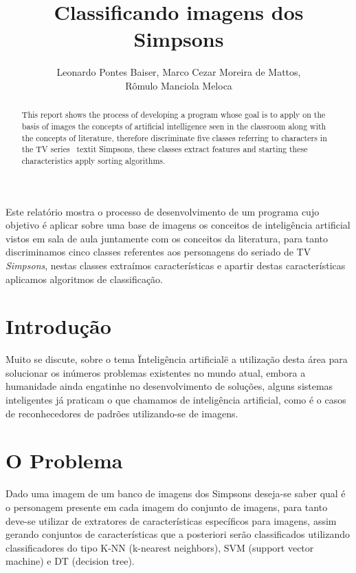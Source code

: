\documentclass[12pt]{article}
\title{Classificando imagens dos Simpsons}
\author{Leonardo Pontes Baiser\inst{1}, Marco Cezar Moreira de Mattos\inst{1},\\
		Rômulo Manciola Meloca\inst{1}}
\begin{document}
	
\maketitle

\begin{abstract}

	This report shows the process of developing a program whose goal is to apply on the basis of images the 	concepts of artificial intelligence seen in the classroom along with the concepts of literature, therefore discriminate five classes referring to characters in the TV series \ textit {Simpsons}, these classes extract features and starting these characteristics apply sorting algorithms.

	\end{abstract}
     
\begin{resumo} 
  Este relatório mostra o processo de desenvolvimento de um programa cujo objetivo é aplicar sobre uma base de imagens os conceitos de inteligência artificial vistos em sala de aula juntamente com os conceitos da literatura, para tanto discriminamos cinco classes referentes aos personagens do seriado de TV \textit{Simpsons}, nestas classes extraímos características e apartir destas características aplicamos algoritmos de classificação.	
\end{resumo}

\section{Introdução}\label{sec:introducao}

	Muito se discute, sobre o tema \"Inteligência artificial\" e a utilização desta área para solucionar os inúmeros problemas existentes no mundo atual, embora a humanidade ainda engatinhe no desenvolvimento de soluções, alguns sistemas inteligentes já praticam o que chamamos de inteligência artificial, como é o casos de reconhecedores de padrões utilizando-se de imagens.

\section{O Problema}\label{sec:problema}

	Dado uma imagem de um banco de imagens dos Simpsons deseja-se saber qual é o personagem presente em cada imagem do conjunto de imagens, para tanto deve-se utilizar de extratores de características específicos para imagens, assim gerando conjuntos de características que a posteriori serão classificados utilizando classificadores do tipo K-NN (k-nearest neighbors), SVM (support vector machine) e DT (decision tree).
\end{document}
